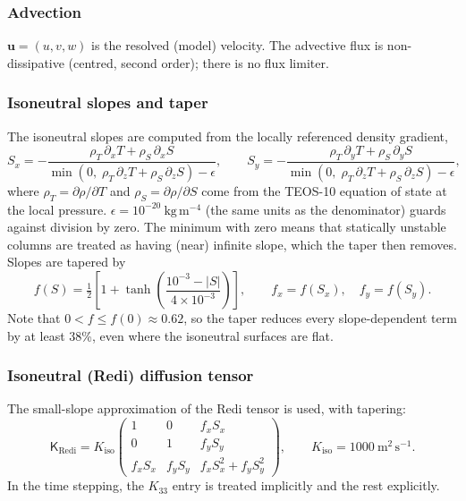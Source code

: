 \documentclass{article}
\begin{document}
\subsubsection*{Advection}
$\mathbf{u} = (u, v, w)$ is the resolved (model) velocity. The advective flux is non-dissipative (centred, second order); there is no flux limiter.

\subsubsection*{Isoneutral slopes and taper}
The isoneutral slopes are computed from the locally referenced density gradient,
\[
S_x = -\frac{\rho_T\, \partial_x T + \rho_S\, \partial_x S}{\min\!\left(0,\; \rho_T\, \partial_z T + \rho_S\, \partial_z S\right) - \epsilon},
\qquad
S_y = -\frac{\rho_T\, \partial_y T + \rho_S\, \partial_y S}{\min\!\left(0,\; \rho_T\, \partial_z T + \rho_S\, \partial_z S\right) - \epsilon},
\]
where $\rho_T = \partial\rho/\partial T$ and $\rho_S = \partial\rho/\partial S$ come from the TEOS-10 equation of state \citep{teos10} at the local pressure. $\epsilon = 10^{-20}~\text{kg}\,\text{m}^{-4}$ (the same units as the denominator) guards against division by zero.
The minimum with zero means that statically unstable columns are treated as having (near) infinite slope, which the taper then removes.
Slopes are tapered by
\[
f(S) = \tfrac{1}{2}\left[ 1 + \tanh\!\left( \frac{10^{-3} - |S|}{4\times 10^{-3}} \right) \right],
\qquad f_x = f(S_x), \quad f_y = f(S_y).
\]
Note that $0 < f \le f(0) \approx 0.62$, so the taper reduces every slope-dependent term by at least 38\%, even where the isoneutral surfaces are flat.

\subsubsection*{Isoneutral (Redi) diffusion tensor}
The small-slope approximation of the Redi tensor \citep{redi1982} is used, with tapering:
\[
\mathsf{K}_\text{Redi} = K_\text{iso}
\begin{pmatrix}
1 & 0 & f_x S_x \\
0 & 1 & f_y S_y \\
f_x S_x & f_y S_y & f_x S_x^2 + f_y S_y^2
\end{pmatrix},
\qquad K_\text{iso} = 1000~\text{m}^2\,\text{s}^{-1}.
\]
In the time stepping, the $K_{33}$ entry is treated implicitly and the rest explicitly.
\end{document}

